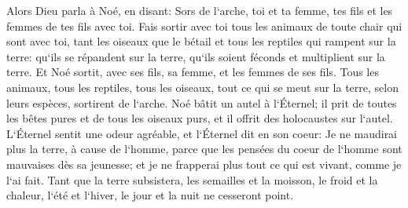\verse Alors Dieu parla à Noé, en disant: 
\verse Sors de l`arche, toi et ta femme, tes fils et les femmes de tes fils avec toi. 
\verse Fais sortir avec toi tous les animaux de toute chair qui sont avec toi, tant les oiseaux que le bétail et tous les reptiles qui rampent sur la terre: qu`ils se répandent sur la terre, qu`ils soient féconds et multiplient sur la terre. 
\verse Et Noé sortit, avec ses fils, sa femme, et les femmes de ses fils. 
\verse Tous les animaux, tous les reptiles, tous les oiseaux, tout ce qui se meut sur la terre, selon leurs espèces, sortirent de l`arche. 
\verse Noé bâtit un autel à l`Éternel; il prit de toutes les bêtes pures et de tous les oiseaux purs, et il offrit des holocaustes sur l`autel. 
\verse L`Éternel sentit une odeur agréable, et l`Éternel dit en son coeur: Je ne maudirai plus la terre, à cause de l`homme, parce que les pensées du coeur de l`homme sont mauvaises dès sa jeunesse; et je ne frapperai plus tout ce qui est vivant, comme je l`ai fait. 
\verse Tant que la terre subsistera, les semailles et la moisson, le froid et la chaleur, l`été et l`hiver, le jour et la nuit ne cesseront point. 

